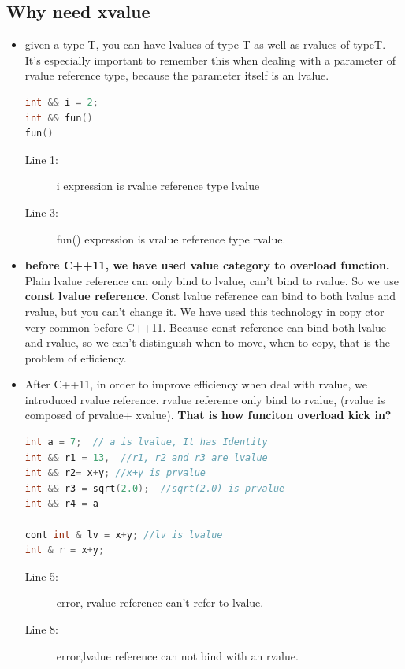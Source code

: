 \documentclass[a4paper,11pt,twoside]{book}
\begin{document}
\subsection{Why need xvalue}
\begin{itemize}
	\item given a type T, you can have lvalues of type T as well as rvalues of typeT. It's especially important to remember this when dealing with a parameter of rvalue reference type, because the parameter itself is an lvalue.
\begin{lstlisting}[frame=single, language=c++, mathescape=true]
int && i = 2;  
int && fun()
fun() 
\end{lstlisting}
\begin{description}
	\item[Line 1:] i expression is rvalue reference type lvalue
	\item[Line 3:] fun() expression is vralue reference type rvalue. 
\end{description}
	
	\item \textbf{before C++11, we have used value category to overload function.} Plain lvalue reference can only bind to lvalue, can't bind to rvalue. So we use \textbf{const lvalue reference}.  Const lvalue reference can bind to both lvalue and rvalue, but you can't change it. We have used this technology in copy ctor very common before C++11. Because const reference can bind both lvalue and rvalue, so we can't distinguish when to move, when to copy, that is the problem of efficiency.
	
	\item After C++11, in order to improve efficiency when deal with rvalue, we introduced rvalue reference.  rvalue reference only bind to rvalue, (rvalue is composed of prvalue+ xvalue). \textbf{That is how funciton overload kick in?}

\begin{lstlisting}[frame=single, language=c++, mathescape=true]
int a = 7;  // a is lvalue, It has Identity
int && r1 = 13,  //r1, r2 and r3 are lvalue
int && r2= x+y; //x+y is prvalue
int && r3 = sqrt(2.0);  //sqrt(2.0) is prvalue
int && r4 = a 

cont int & lv = x+y; //lv is lvalue
int & r = x+y; 
\end{lstlisting}
\begin{description}
	\item[Line 5:] error, rvalue reference can't refer to lvalue.
	\item[Line 8:] error,lvalue reference can not bind with an rvalue.
\end{description}


\end{itemize}
\end{document}
